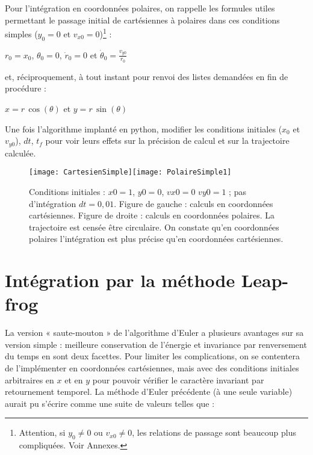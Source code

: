 Pour l'intégration en coordonnées polaires, on rappelle les formules utiles permettant le passage initial de cartésiennes à polaires dans ces conditions simples ($y_0 = 0$ et $v_{x0} = 0$)\footnote{Attention, si $y_0 \neq 0$ ou $v_{x0} \neq 0$, les relations de passage sont beaucoup plus compliquées. Voir Annexes.} :

\begin{center}$r_0 = x_0$, $\theta_0=0$, $\dot{r}_0 = 0$ et $\dot{\theta}_0 = \frac{v_{y0}}{r_0}$\end{center}

et, réciproquement, à tout instant pour renvoi des listes demandées en fin de procédure :

\begin{center}$x=r\,\cos(\theta)$ et $y=r\,\sin(\theta)$\end{center}

Une fois l'algorithme implanté en python, modifier les conditions initiales ($x_0$ et $v_{y0}$), $dt$, $t_f$ pour voir leurs effets sur la précision de calcul et sur la trajectoire calculée.

\vspace{1cm}

\begin{figure}[htp]
 \centering
 \texttt{[image: CartesienSimple]}\texttt{[image: PolaireSimple1]}%
 \caption{Conditions initiales : $x0=1$, $y0=0$, $vx0=0$ $vy0=1$ ; pas d'intégration $dt = 0,01$. Figure de gauche : calculs en coordonnées cartésiennes. Figure de droite : calculs en coordonnées polaires. La trajectoire est censée être circulaire. On constate qu'en coordonnées polaires l'intégration est plus précise qu'en coordonnées cartésiennes.}
\end{figure}

\newpage
\section{Intégration par la méthode Leap-frog}

La version « saute-mouton » de l’algorithme d’Euler a plusieurs avantages sur sa version simple : meilleure conservation de l’énergie et invariance par renversement du temps en sont deux facettes. Pour limiter les complications, on se contentera de l’implémenter en coordonnées cartésiennes, mais avec des conditions initiales arbitraires en $x$ et en $y$ pour pouvoir vérifier le caractère invariant par retournement temporel. La méthode d’Euler précédente (à une seule variable) aurait pu s’écrire comme une suite de valeurs telles que :

